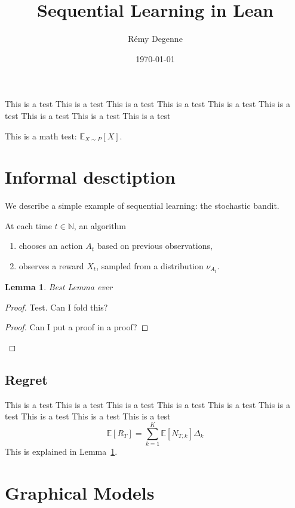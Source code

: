 \documentclass{article}
\title{Sequential Learning in Lean}
\author{Rémy Degenne}
\date{\today}
\newtheorem{lemma}[theorem]{Lemma}
\begin{document}
\maketitle

This is a test This is a test This is a test This is a test This is a test This is a test This is a test This is a test This is a test 

This is a math test: $\mathbb{E}_{X \sim P}[X]$.

\section{Informal desctiption}

We describe a simple example of sequential learning: the stochastic bandit.

At each time $t \in \mathbb{N}$, an algorithm
\begin{enumerate}
	\item chooses an action $A_t$ based on previous observations,
	\item observes a reward $X_t$, sampled from a distribution $\nu_{A_t}$.
\end{enumerate}

\begin{lemma}\label{lem:best}
Best Lemma ever
\end{lemma}
\begin{proof}
Test. Can I fold this?
\begin{proof}
Can I put a proof in a proof?
\end{proof}
\end{proof}

\subsection{Regret}

This is a test This is a test This is a test This is a test This is a test This is a test This is a test This is a test This is a test 
\begin{equation}
\mathbb{E}[R_T] = \sum_{k=1}^K \mathbb{E}[N_{T,k}] \Delta_k 
\end{equation}
This is explained in Lemma~\ref{lem:best}.

\cite{lattimore2020bandit}

\section{Graphical Models}
\label{sec:graphical_models}




\end{document}
